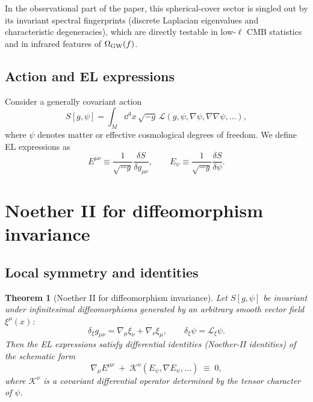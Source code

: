 \documentclass[
  reprint,
  amsmath,amssymb,
  aps,
  prd,
  superscriptaddress,
  nofootinbib,
  longbibliography
]{revtex4-2}
\newcommand{\Lie}{\mathcal L}
\newtheorem{theorem}{Theorem}
\theoremstyle{definition}
\theoremstyle{remark}
\begin{document}
In the observational part of the paper, this spherical-cover sector is singled out by its invariant spectral
fingerprints (discrete Laplacian eigenvalues and characteristic degeneracies), which are directly testable in
low-$\ell$ CMB statistics and in infrared features of $\Omega_{\rm GW}(f)$.

\subsection{Action and EL expressions}
Consider a generally covariant action
\begin{equation}
S[g,\psi]=\int_{M}\dd^4x\,\sqrt{-g}\,\mathcal L(g,\psi,\nabla\psi,\nabla\nabla\psi,\dots),
\label{eq:action_general}
\end{equation}
where $\psi$ denotes matter or effective cosmological degrees of freedom. We define EL expressions as
\begin{equation}
E^{\mu\nu}\equiv \frac{1}{\sqrt{-g}}\frac{\delta S}{\delta g_{\mu\nu}},
\qquad
E_{\psi}\equiv \frac{1}{\sqrt{-g}}\frac{\delta S}{\delta \psi}.
\label{eq:EL_defs}
\end{equation}

\section{Noether II for diffeomorphism invariance}
\subsection{Local symmetry and identities}
\begin{theorem}[Noether II for diffeomorphism invariance]
\label{thm:noetherII_diff}
Let $S[g,\psi]$ be invariant under infinitesimal diffeomorphisms generated by an arbitrary smooth vector field
$\xi^\mu(x)$:
\begin{equation}
\delta_\xi g_{\mu\nu}=\nabla_\mu\xi_\nu+\nabla_\nu\xi_\mu,
\qquad
\delta_\xi \psi=\Lie_\xi \psi.
\label{eq:diff_variations}
\end{equation}
Then the EL expressions satisfy differential identities (Noether-II identities) of the schematic form
\begin{equation}
\nabla_\mu E^{\mu\nu} \;+\; \mathcal K^\nu(E_\psi,\nabla E_\psi,\dots)\;\equiv\;0,
\label{eq:noetherII_identity}
\end{equation}
where $\mathcal K^\nu$ is a covariant differential operator determined by the tensor character of $\psi$.
\end{theorem}
\end{document}
